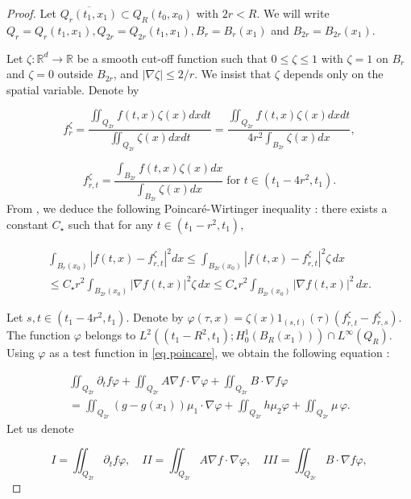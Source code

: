 \documentclass[reqno,12pt,twoside]{amsart}
\numberwithin{equation}{section} \numberwithin{theorem}{section}
\numberwithin{proposition}{section} \numberwithin{lemma}{section}
\numberwithin{corollary}{section}
\numberwithin{definition}{section} \numberwithin{remark}{section}
\begin{document}
\begin{proof}
Let $\overline{Q_r(t_1, x_1)}\subset Q_R(t_0,x_0)$ with $2r < R$. We will write $Q_r = Q_r(t_1, x_1), Q_{2r}= Q_{2r}(t_1, x_1), B_r = B_r(x_1)$ and $B_{2r}= B_{2r}(x_1)$.

\smallskip

Let $\zeta : \mathbb{R}^d \rightarrow \mathbb{R}$ be a smooth cut-off function such that $0\leqslant \zeta \leqslant 1$ with $\zeta = 1$ on $B_r$ and $\zeta = 0$ outside $B_{2r}$, and $|\nabla \zeta | \leqslant 2/r$. We insist that $\zeta$ depends only on the spatial variable. 
Denote by 

\[f_r^\zeta = \frac{\iint_{Q_{2r}} f(t,x)\zeta(x) dx dt}{\iint_{Q_{2r}} \zeta(x) dx dt} = \frac{\iint_{Q_{2r}} f(t,x)\zeta(x) dx dt}{4 r^2 \int_{B_{2r}} \zeta(x) dx},\]

\[f_{r,t}^{\zeta} = \frac{\int_{B_{2r}} f(t,x) \zeta(x) dx}{\int_{B_{2r}} \zeta(x) dx} \; \text{for } t\in (t_1-4r^2, t_1).\]
From \cite[Theorem 1.5]{FKS82}, we deduce the following Poincaré-Wirtinger inequality : there exists a constant $C_\star$ such that for any $t \in (t_1 -r^2 , t_1)$,  

\begin{multline}\label{Poincare ref}
\int_{B_r(x_0)} \left|f(t,x) - f_{r,t}^\zeta\right|^2 dx \leqslant \int_{B_{2r}(x_0)} \left|f(t,x) - f_{r,t}^\zeta\right|^2 \zeta \, dx\\
\leqslant C_\star r^2\int_{B_{2r}(x_0)} |\nabla f(t,x)|^2 \zeta \, dx \leqslant C_\star r^2 \int_{B_{2r}(x_0)} |\nabla f (t,x)|^2 \, dx.
\end{multline}

Let $s,t\in (t_1-4r^2, t_1)$. Denote by $\varphi (\tau, x) = \zeta(x) 1_{(s,t)}(\tau) (f_{r,t}^\zeta - f_{r,s}^\zeta)$. The function $\varphi$ belongs to $L^2((t_1-R^2,t_1);H_0^1(B_R(x_1))) \cap L^\infty(Q_R)$. Using $\varphi$ as a test function in \eqref{eq poincare}, we obtain the following equation : 

\begin{multline}\label{Poinc 0}
\iint_{Q_{2r}} \partial_t f \varphi + \iint_{Q_{2r}} A\nabla f \cdot \nabla \varphi + \iint_{Q_{2r}} B\cdot\nabla f  \varphi\\ = \iint_{Q_{2r}} (g-g(x_1)) \mu_1 \cdot \nabla \varphi + \iint_{Q_{2r}} h \mu_2 \varphi + \iint_{Q_{2r}}\mu \,\varphi. 
\end{multline}
Let us denote 

\[I =\iint_{Q_{2r}} \partial_t f\varphi, \quad II =  \iint_{Q_{2r}} A\nabla f \cdot \nabla \varphi , \quad III=\iint_{Q_{2r}} B\cdot \nabla f \varphi,\]


\end{proof}
\end{document}

